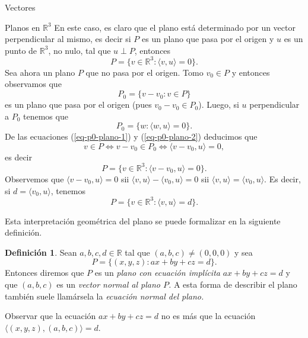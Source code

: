 \documentclass[a4paper,12pt,twoside,spanish,reqno]{amsbook}
\theoremstyle{definition}
\newtheorem{definicion}{Definici\'on}[section]
\theoremstyle{remark}
\newcommand{\la}{\langle}
\newcommand{\ra}{\rangle}
\newcommand{\R}{\mathbb R}
\begin{document}
\begin{chapter}{Vectores}
\begin{section}{Planos en $\R^3$}
		En  este caso,  es claro que el plano está determinado por un vector perpendicular al mismo, es decir si $P$  es un plano que pasa por el origen y $u$ es un punto de $\R^3$, no nulo, tal que $u \perp P$,  entonces
		\begin{equation*}
			P = \{ v \in \R^3: \la v,u \ra=0 \}. 
		\end{equation*}
		Sea ahora un  plano $P$ que no pasa por el origen.  Tomo $v_0 \in P$ y entonces observamos que
		\begin{equation}\label{eq-p0-plano-1}
			P_0 = \{v-v_0: v \in P \}
		\end{equation} 
		es un plano que pasa por el origen (pues $v_0-v_0 \in P_0$). Luego,  si $u$ perpendicular a $P_0$ tenemos que
		\begin{equation}\label{eq-p0-plano-2}
		P_0 = \{w: \la w,u \ra=0\}.
		\end{equation}
		De las ecuaciones (\ref{eq-p0-plano-1}) y  (\ref{eq-p0-plano-2}) deducimos que 
		\begin{equation*}
			v \in P \Leftrightarrow v-v_0 \in P_0 \Leftrightarrow \la v-v_0,u \ra=0,
		\end{equation*}
		 es decir
		\begin{equation*}
			P = \{ v \in \R^3: \la v-v_0,u \ra=0 \}. 
		\end{equation*}  
		Observemos que  $\la v-v_0,u \ra=0$ sii $\la v,u \ra-\la v_0,u \ra=0$ sii $\la v,u \ra=\la v_0,u \ra$. Es decir, si $d = \la v_0,u \ra$, tenemos
		\begin{equation*}
		P = \{ v \in \R^3: \la v,u \ra=d \}. 
		\end{equation*} 
		
		Esta interpretación geométrica del plano se puede formalizar en la siguiente definición.
		
		
		\begin{definicion}\label{def-eq-implicita-plano} Sean $a,b, c,d \in \R$ tal que $(a,b,c) \ne (0,0,0)$ y sea 
		\begin{equation*}
			P = \{(x,y,z): ax +by +cz =d\}.
		\end{equation*}
		Entonces diremos que $P$  es  un \textit{plano con ecuación implícita}\index{plano en $\R^3$!ecuación implícita}  $ax +by +cz =d$ y  que $(a,b,c)$ es un \textit{vector normal al plano $P$.} A esta forma de describir el plano también suele llamársela la \textit{ecuación normal del plano.}
		\end{definicion} 
		
		Observar que la ecuación $ ax +by +cz =d$ no es más que la ecuación $\la(x,y,z),(a,b,c) \ra=d$. 	
		

\end{section}
\end{chapter}
\end{document}
